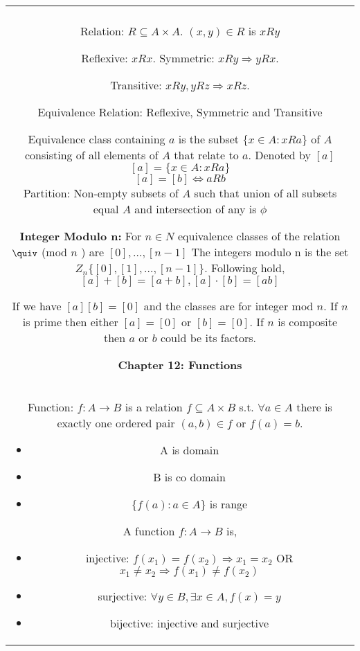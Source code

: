 \documentclass[a4paper]{article}
\begin{document}
    \pagestyle{empty}%
    \noindent
    \begin{tabular}{@{}c@{}}
    \begin{minipage}[t][\paperheight][t]{0.49\paperwidth}%
        \textbf{Chapter 11: Relations}\\
        Relation: $R \subseteq A \times  A$. $(x,y) \in R$ is $xRy$

        \qquad Reflexive: $xRx$. Symmetric:  $xRy \Rightarrow yRx$. 

        Transitive: $xRy, yRz \Rightarrow xRz$.

        Equivalence Relation: Reflexive, Symmetric and Transitive

        \qquad Equivalence class containing  $a$ is the subset $\{x \in A: xRa\}$ of  $A$ consisting of all elements of $A$ that relate to $a$. Denoted by $[a]$
        $$ [a] = \{x \in A: xRa\} $$ 
        $$ [a] = [b] \iff aRb $$ 
    Partition: Non-empty subsets of $A$ such that union of all subsets equal $A$ and intersection of any is $\phi$

    \textbf{Integer Modulo n:} For $n \in N$ equivalence classes of the relation $\quiv $ (mod $n$ ) are $[0],\dots,[n-1]$ The integers modulo n is the set $Z_n\{[0],[1],\dots,[n-1]\}$. Following hold, 
    $$ [a]+[b] = [a + b], [a]\cdot[b]=[ab] $$ 



    If we have $[a][b] = [0]$ and the classes are for integer mod $n$. If $n$ is prime then either $[a] = [0]$ or $[b]= [0]$. If $n$ is composite then  $a$ or $b$ could be its factors.

        \textbf{Chapter 12: Functions}\\
        Function: $f:A \rightarrow B$ is a relation $f \subseteq A \times  B$ s.t. $\forall a \in A$ there is exactly one ordered pair $(a,b) \in f$ or $f(a) = b$.
        
        \begin{itemize}
            \item A is domain
            \item B is co domain
            \item $\{f(a): a \in A\}$ is range
        \end{itemize}

        A function $f: A \rightarrow B $ is, 
        \begin{itemize}
            \item injective: $f(x_1) = f(x_2) \Rightarrow x_1 = x_2$ OR $x_1\ne x_2 \Rightarrow f(x_1) \ne f(x_2)$
            \item surjective: $\forall y \in B, \exists x \in A, f(x) = y$ 
            \item bijective: injective and surjective
        \end{itemize}



\end{minipage}
\end{tabular}
\end{document}
